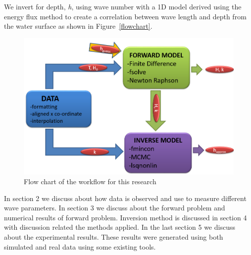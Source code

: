 We invert for depth, \textit{h}, using wave number with a 1D model derived using the energy flux method to create a correlation between wave length and depth from the water surface as shown in Figure~\ref{flowchart}.
\begin{figure}[H]
		\centering
		\includegraphics[width=.90\linewidth]{img/Flow_Chart.png}
		\caption{Flow chart of the workflow for this research}
		\label{AWAC}
\end{figure}
In section 2 we discuss about how data is observed and use to measure different wave parameters. In section 3 we discuss about the forward problem and numerical results of forward problem. Inversion method is discussed in section 4 with discussion related the methods applied. In the last section 5 we discuss about the experimental results. These results were generated using both simulated and real data using some existing tools.